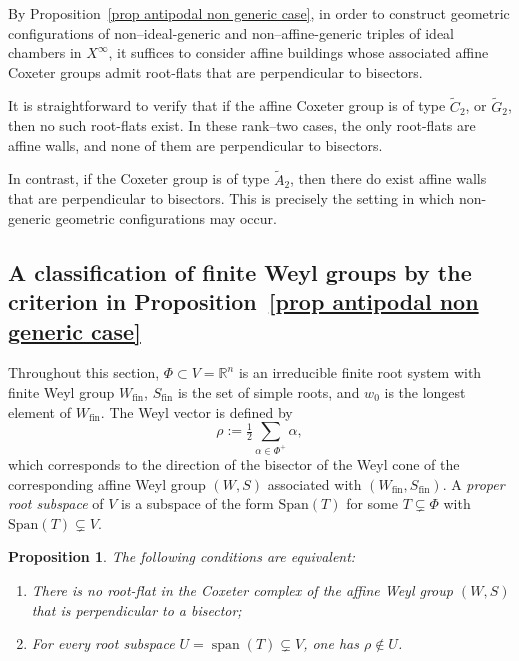 \documentclass[11pt]{amsart}
\DeclareMathOperator{\Span}{span}
\theoremstyle{plain}
\newtheorem{prop}[thm]{Proposition}
\theoremstyle{definition}
\theoremstyle{remark}
\begin{document}
	By Proposition~\ref{prop antipodal non generic case}, in order to construct geometric configurations of non--ideal-generic and non--affine-generic triples of ideal chambers in \(X^{\infty}\), it suffices to consider affine buildings whose associated affine Coxeter groups admit root-flats that are perpendicular to bisectors.
	
	It is straightforward to verify that if the affine Coxeter group is of type \(\widetilde{C}_2\), or \(\widetilde{G}_2\), then no such root-flats exist. In these rank--two cases, the only root-flats are affine walls, and none of them are perpendicular to bisectors. 
	
	In contrast, if the Coxeter group is of type \(\widetilde{A}_2\), then there do exist affine walls that are perpendicular to bisectors. This is precisely the setting in which non-generic geometric configurations may occur.
	
	
	\subsection{A classification of finite Weyl groups by the criterion in Proposition~\ref{prop antipodal non generic case}}
	
	
	Throughout this section, $\Phi \subset V = \mathbb{R}^n$ is an irreducible finite root system with finite Weyl group $ W_{\mathrm{fin}}$, $S_{\mathrm{fin}}$ is the set of simple roots, and $w_0$ is the longest element of $ W_{\mathrm{fin}}$. The Weyl vector is defined by
	\[
	\rho := \tfrac12 \sum_{\alpha \in \Phi^+} \alpha,
	\]
	which corresponds to the direction of the bisector of the Weyl cone of the corresponding affine Weyl group $(W,S)$ associated with $( W_{\mathrm{fin}}, S_{\mathrm{fin}})$.  A \emph{proper root subspace} of $V$ is a subspace of the form $\mathrm{Span}(T)$ for some $T \subsetneq \Phi$ with $\mathrm{Span}(T) \subsetneq V$.
	
	\begin{prop}\label{prop:geom_criterion}
		The following conditions are equivalent: 
		\begin{enumerate}
			\item There is no root-flat in the Coxeter complex of the affine Weyl group $(W,S)$ that is perpendicular to a bisector; 
			\item For every root subspace \(U=\Span(T)\subsetneq V\), one has \(\rho\notin U\).
		\end{enumerate}
		
	\end{prop}
	
\end{document}
